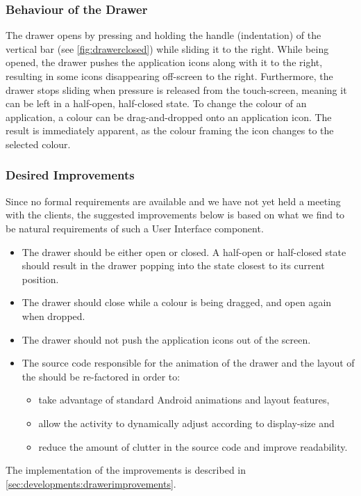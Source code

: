 \subsubsection{Behaviour of the Drawer}\label{sec:drawer:behaviour}
The drawer opens by pressing and holding the handle (indentation) of the vertical bar (see \cref{fig:drawerclosed}) while sliding it to the right.
While being opened, the drawer pushes the application icons along with it to the right, resulting in some icons disappearing off-screen to the right.
Furthermore, the drawer stops sliding when pressure is released from the touch-screen, meaning it can be left in a half-open, half-closed state.
To change the colour of an application, a colour can be drag-and-dropped onto an application icon. 
The result is immediately apparent, as the colour framing the icon changes to the selected colour.

\subsubsection{Desired Improvements}
Since no formal requirements are available and we have not yet held a meeting with the clients, the suggested improvements below is based on what we find to be natural requirements of such a User Interface component. 

\begin{itemize}
\item The drawer should be either open or closed. A half-open or half-closed state should result in the drawer popping into the state closest to its current position.
\item The drawer should close while a colour is being dragged, and open again when dropped.
\item The drawer should not push the application icons out of the screen.
\item The source code responsible for the animation of the drawer and the layout of the \homeactivity should be re-factored in order to:
	\begin{itemize}
	\item take advantage of standard Android animations and layout features,
	\item allow the activity to dynamically adjust according to display-size and
	\item reduce the amount of clutter in the source code and improve readability.
	\end{itemize}
\end{itemize}

The implementation of the improvements is described in \cref{sec:developments:drawerimprovements}.